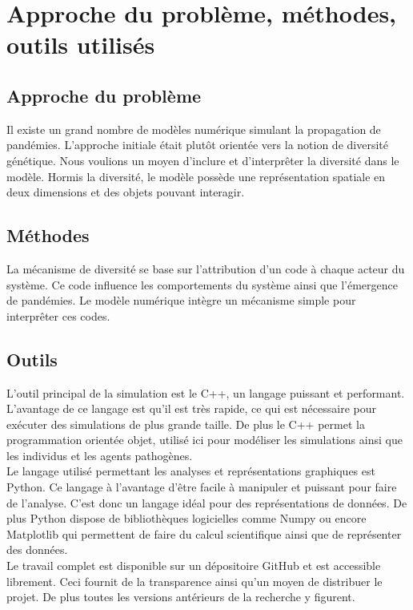 \chapter{Approche du problème, méthodes, outils utilisés} \label{ch:approche}

\section{Approche du problème}
Il existe un grand nombre de modèles numérique simulant la propagation de pandémies. L'approche initiale était plutôt orientée vers la notion de diversité génétique. Nous voulions un moyen d'inclure et d'interprêter la diversité dans le modèle. Hormis la diversité, le modèle possède une représentation spatiale en deux dimensions et des objets pouvant interagir.

\section{Méthodes}
La mécanisme de diversité se base sur l'attribution d'un code à chaque acteur du système. Ce code influence les comportements du système ainsi que l'émergence de pandémies. Le modèle numérique intègre un mécanisme simple pour interprêter ces codes.

\section{Outils}
L'outil principal de la simulation est le C++, un langage puissant et performant. L'avantage de ce langage est qu'il est très rapide, ce qui est nécessaire pour exécuter des simulations de plus grande taille. De plus le C++ permet la programmation orientée objet, utilisé ici pour modéliser les simulations ainsi que les individus et les agents pathogènes.\\

Le langage utilisé permettant les analyses et représentations graphiques est Python. Ce langage à l'avantage d'être facile à manipuler et puissant pour faire de l'analyse. C'est donc un langage idéal pour des représentations de données. De plus Python dispose de bibliothèques logicielles comme Numpy ou encore Matplotlib qui permettent de faire du calcul scientifique ainsi que de représenter des données.\\

Le travail complet est disponible sur un dépositoire GitHub et est accessible librement. Ceci fournit de la transparence ainsi qu'un moyen de distribuer le projet. De plus toutes les versions antérieurs de la recherche y figurent.
